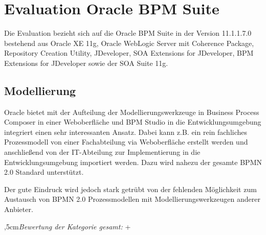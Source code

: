 \newpage
\section{Evaluation Oracle BPM Suite}
\label{evaluationOracle}
Die Evaluation bezieht sich auf die Oracle BPM Suite in der Version 11.1.1.7.0 bestehend aus Oracle XE 11g, Oracle WebLogic Server mit Coherence Package, Repository Creation Utility, JDeveloper, SOA Extensions for JDeveloper, BPM Extensions for JDeveloper sowie der SOA Suite 11g.



%
%

\subsection{Modellierung}

Oracle bietet mit der Aufteilung der Modellierungswerkzeuge in Business Process Composer in einer Weboberfläche und BPM Studio in die Entwicklungsumgebung integriert einen sehr interessanten Ansatz. Dabei kann z.B. ein rein fachliches Prozessmodell von einer Fachabteilung via Weboberfläche erstellt werden und anschließend von der IT-Abteilung zur Implementierung in die Entwicklungsumgebung importiert werden. Dazu wird nahezu der gesamte \ac{BPMN} 2.0 Standard unterstützt. 

Der gute Eindruck wird jedoch stark getrübt von der fehlenden Möglichkeit zum Austausch von \ac{BPMN} 2.0 Prozessmodellen mit Modellierungswerkzeugen anderer Anbieter.

\bigskip{},5cm\textit{Bewertung der Kategorie gesamt:} \hspace{5mm} \textcircled{+}
\leftskip=0cm

